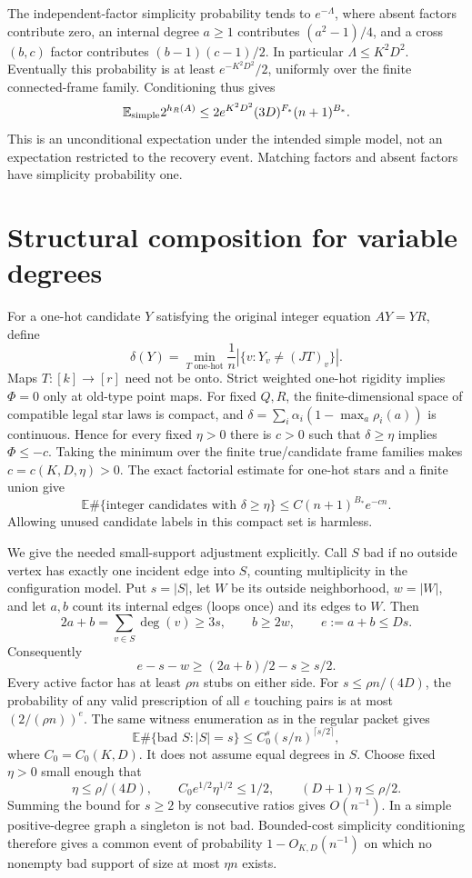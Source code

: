\documentclass[11pt]{article}
\newcommand{\E}{\mathbb E}
\begin{document}
The independent-factor simplicity probability tends to $e^{-\Lambda}$,
where absent factors contribute zero, an internal degree $a\ge1$
contributes $(a^2-1)/4$, and a cross $(b,c)$ factor contributes
$(b-1)(c-1)/2$. In particular $\Lambda\le K^2D^2$.
Eventually this probability is at least $e^{-K^2D^2}/2$, uniformly over
the finite connected-frame family. Conditioning thus gives
\begin{equation}\label{eq:moment}
 \E_{\rm simple}2^{h_R(A)}
 \le 2e^{K^2D^2}(3D)^{F_*}(n+1)^{B_*}.
\end{equation}
This is an unconditional expectation under the intended simple model,
not an expectation restricted to the recovery event. Matching factors
and absent factors have simplicity probability one.

\section{Structural composition for variable degrees}
For a one-hot candidate $Y$ satisfying the original integer equation
$AY=YR$, define
\[
 \delta(Y)=\min_{T\text{ one-hot}}\frac1n
                 |\{v:Y_v\ne(JT)_v\}|.
\]
Maps $T:[k]\to[r]$ need not be onto. Strict weighted one-hot rigidity
implies $\Phi=0$ only at old-type point maps. For fixed $Q,R$, the
finite-dimensional space of compatible legal star laws is compact,
and $\delta=\sum_i\alpha_i(1-\max_a\rho_i(a))$ is continuous.
Hence for every fixed $\eta>0$ there is $c>0$ such that
$\delta\ge\eta$ implies $\Phi\le-c$. Taking the minimum over the
finite true/candidate frame families makes $c=c(K,D,\eta)>0$.
The exact factorial estimate for one-hot stars and a finite union give
\begin{equation}\label{eq:macro}
 \E\#\{\text{integer candidates with }\delta\ge\eta\}
 \le C(n+1)^{B_*}e^{-cn}.
\end{equation}
Allowing unused candidate labels in this compact set is harmless.

We give the needed small-support adjustment explicitly. Call $S$ bad
if no outside vertex has exactly one incident edge into $S$, counting
multiplicity in the configuration model. Put $s=|S|$, let $W$ be its
outside neighborhood, $w=|W|$, and let $a,b$ count its internal edges
(loops once) and its edges to $W$. Then
\[
 2a+b=\sum_{v\in S}\deg(v)\ge3s,\qquad b\ge2w,
 \qquad e:=a+b\le Ds.
\]
Consequently
\[
 e-s-w\ge (2a+b)/2-s\ge s/2.
\]
Every active factor has at least $\rho n$ stubs on either side. For
$s\le\rho n/(4D)$, the probability of any valid prescription of all
$e$ touching pairs is at most $(2/(\rho n))^e$. The same witness
enumeration as in the regular packet gives
\[
 \E\#\{\text{bad }S:|S|=s\}
 \le C_0^s(s/n)^{\lceil s/2\rceil},
\]
where $C_0=C_0(K,D)$. It does not assume equal degrees in $S$.
Choose fixed $\eta>0$ small enough that
\[
 \eta\le\rho/(4D),\qquad
 C_0e^{1/2}\eta^{1/2}\le1/2,\qquad
 (D+1)\eta\le\rho/2.
\]
Summing the bound for $s\ge2$ by consecutive ratios gives $O(n^{-1})$.
In a simple positive-degree graph a singleton is not bad. Bounded-cost
simplicity conditioning therefore gives a common event of probability
$1-O_{K,D}(n^{-1})$ on which no nonempty bad support of size at most
$\eta n$ exists.
\end{document}
